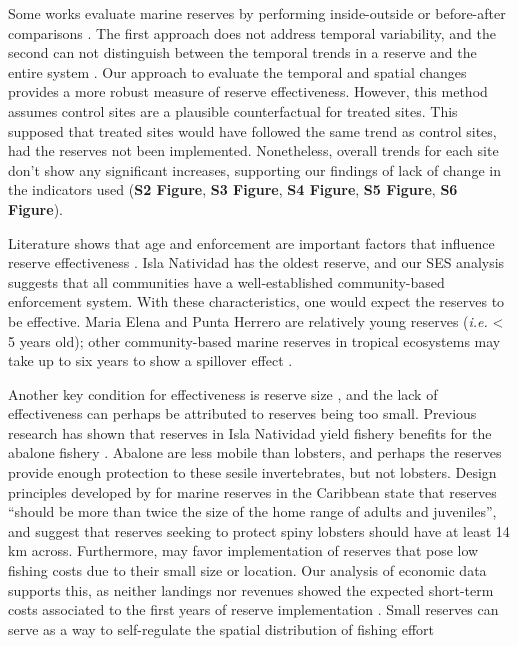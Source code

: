 \documentclass{frontiersSCNS}
\begin{document}
Some works evaluate marine reserves by performing inside-outside
\citep{guidetti_2014-8Z,friedlander_2017-oI,rodriguez_2017-PD} or
before-after comparisons \citep{betti_2017-lq}. The first approach does
not address temporal variability, and the second can not distinguish
between the temporal trends in a reserve and the entire system
\citep{depalma_2018}. Our approach to evaluate the temporal and spatial
changes provides a more robust measure of reserve effectiveness.
However, this method assumes control sites are a plausible
counterfactual for treated sites. This supposed that treated sites would
have followed the same trend as control sites, had the reserves not been
implemented. Nonetheless, overall trends for each site don't show any
significant increases, supporting our findings of lack of change in the
indicators used (\textbf{S2 Figure}, \textbf{S3 Figure}, \textbf{S4
Figure}, \textbf{S5 Figure}, \textbf{S6 Figure}).

Literature shows that age and enforcement are important factors that
influence reserve effectiveness \citep{edgar_2014-UO}. Isla Natividad
has the oldest reserve, and our SES analysis suggests that all
communities have a well-established community-based enforcement system.
With these characteristics, one would expect the reserves to be
effective. Maria Elena and Punta Herrero are relatively young reserves
(\emph{i.e.} \textless{} 5 years old); other community-based marine
reserves in tropical ecosystems may take up to six years to show a
spillover effect \citep{dasilva_2015-zX}.

Another key condition for effectiveness is reserve size
\citep{edgar_2014-UO}, and the lack of effectiveness can perhaps be
attributed to reserves being too small. Previous research has shown that
reserves in Isla Natividad yield fishery benefits for the abalone
fishery \citep{rossetto_2015-V0}. Abalone are less mobile than lobsters,
and perhaps the reserves provide enough protection to these sesile
invertebrates, but not lobsters. Design principles developed by
\citet{green_2017} for marine reserves in the Caribbean state that
reserves ``should be more than twice the size of the home range of
adults and juveniles'', and suggest that reserves seeking to protect
spiny lobsters should have at least 14 km across. Furthermore, may favor
implementation of reserves that pose low fishing costs due to their
small size or location. Our analysis of economic data supports this, as
neither landings nor revenues showed the expected short-term costs
associated to the first years of reserve implementation
\citep{ovando_2016-Wg}. Small reserves can serve as a way to
self-regulate the spatial distribution of fishing effort
\end{document}

